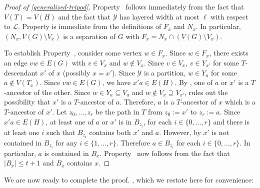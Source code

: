  \begin{proof}[Proof of \cref{generalized-tripod}]
    Property~ follows immediately from the fact that $V(T)=V(H)$  and the fact that $\mathcal{Y}$ has layered width at most $\ell$ with respect to $\mathcal{L}$.
   Property  is immediate from the definitions of $F_x$ and $N_x$.  In particular, $(N_x,V(G)\setminus V_x)$ is a separation of $G$ with $F_x=N_x\cap(V(G)\setminus V_x)$.

   To establish Property~, consider some vertex $w\in F_x$.  Since $w\in F_x$, there exists an edge $vw\in E(G)$ with $v\in V_x$ and $w\not\in V_x$.  Since $v\in V_x$, $v\in Y_{x'}$ for some $T$-descendant $x'$ of $x$ (possibly $x=x'$). Since $\mathcal{Y}$ is a partition, $w\in Y_{a}$ for some $a\not\in V(T_x)$.  Since $vw\in E(G)$, we have $x'a\in E(H)$.  By , one of $a$ or $x'$ is a $T$-ancestor of the other. Since $w\in Y_a\subseteq V_a$ and $w\not\in V_x\supseteq V_{x'}$,  rules out the possibility that $x'$ is a $T$-ancestor of $a$. Therefore, $a$ is a $T$-ancestor of $x$ which is a $T$-ancestor of $x'$.  Let $z_0,\ldots,z_r$ be the path in $T$ from $z_0:=x'$ to $z_r:=a$.  Since $x'a\in E(H)$, at least one of $a$ or $x'$ is in $B_{z_i}$, for each $i\in\{0,\ldots,r\}$ and there is at least one $i$ such that $B_{z_i}$ contains both $x'$ and $a$.  However, by  $x'$ is not contained in $B_{z_i}$ for any $i\in\{1,\ldots,r\}$.  Therefore $a\in B_{z_i}$ for each $i\in\{0,\ldots,r\}$.  In particular, $a$ is contained in $B_x$.
   Property~ now follows from the fact that $|B_x|\le t+1$ and $B_x$ contains $x$.
 \end{proof}



 We are now ready to complete the proof.
 , which we restate here for convenience:

 \mmg*


